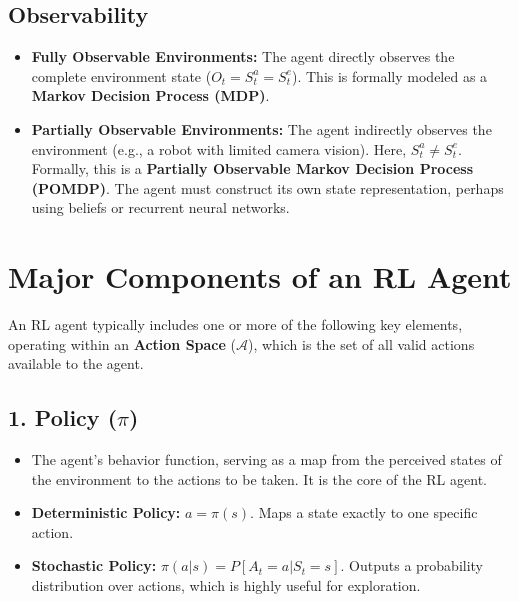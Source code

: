 \documentclass[12pt]{article}
\begin{document}
\subsection*{Observability}
\begin{itemize}[label=$\bullet$]
    \item \textbf{Fully Observable Environments:} The agent directly observes the complete environment state ($O_t = S_t^a = S_t^e$). This is formally modeled as a \textbf{Markov Decision Process (MDP)}.
    \item \textbf{Partially Observable Environments:} The agent indirectly observes the environment (e.g., a robot with limited camera vision). Here, $S_t^a \neq S_t^e$. Formally, this is a \textbf{Partially Observable Markov Decision Process (POMDP)}. The agent must construct its own state representation, perhaps using beliefs or recurrent neural networks.
\end{itemize}

\section*{Major Components of an RL Agent}
An RL agent typically includes one or more of the following key elements, operating within an \textbf{Action Space} ($\mathcal{A}$), which is the set of all valid actions available to the agent.

\subsection*{1. Policy ($\pi$)}
\begin{itemize}[label=$\bullet$]
    \item The agent's behavior function, serving as a map from the perceived states of the environment to the actions to be taken. It is the core of the RL agent.
    \item \textbf{Deterministic Policy:} $a = \pi(s)$. Maps a state exactly to one specific action.
    \item \textbf{Stochastic Policy:} $\pi(a|s) = P[A_t = a | S_t = s]$. Outputs a probability distribution over actions, which is highly useful for exploration.
\end{itemize}
\end{document}
